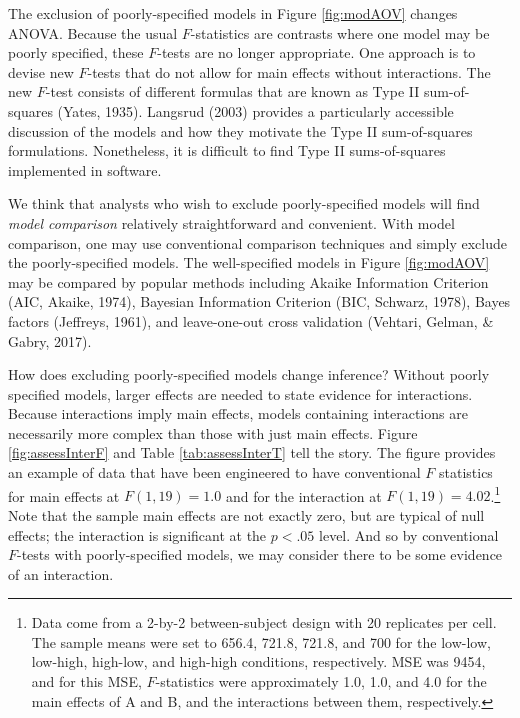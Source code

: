 \documentclass[
  english,
  ,man]{apa6}
\begin{document}
The exclusion of poorly-specified models in Figure \ref{fig:modAOV} changes ANOVA. Because the usual \(F\)-statistics are contrasts where one model may be poorly specified, these \(F\)-tests are no longer appropriate. One approach is to devise new \(F\)-tests that do not allow for main effects without interactions. The new \(F\)-test consists of different formulas that are known as Type II sum-of-squares (Yates, 1935). Langsrud (2003) provides a particularly accessible discussion of the models and how they motivate the Type II sum-of-squares formulations. Nonetheless, it is difficult to find Type II sums-of-squares implemented in software.

We think that analysts who wish to exclude poorly-specified models will find \emph{model comparison} relatively straightforward and convenient. With model comparison, one may use conventional comparison techniques and simply exclude the poorly-specified models. The well-specified models in Figure \ref{fig:modAOV} may be compared by popular methods including Akaike Information Criterion (AIC, Akaike, 1974), Bayesian Information Criterion (BIC, Schwarz, 1978), Bayes factors (Jeffreys, 1961), and leave-one-out cross validation (Vehtari, Gelman, \& Gabry, 2017).

How does excluding poorly-specified models change inference? Without poorly specified models, larger effects are needed to state evidence for interactions. Because interactions imply main effects, models containing interactions are necessarily more complex than those with just main effects. Figure \ref{fig:assessInterF} and Table \ref{tab:assessInterT} tell the story. The figure provides an example of data that have been engineered to have conventional \(F\) statistics for main effects at \(F(1,19)=1.0\) and for the interaction at \(F(1,19)=4.02\).\footnote{Data come from a 2-by-2 between-subject design with 20 replicates per cell. The sample means were set to 656.4, 721.8, 721.8, and 700 for the low-low, low-high, high-low, and high-high conditions, respectively. MSE was 9454, and for this MSE, \(F\)-statistics were approximately 1.0, 1.0, and 4.0 for the main effects of A and B, and the interactions between them, respectively.} Note that the sample main effects are not exactly zero, but are typical of null effects; the interaction is significant at the \(p<.05\) level. And so by conventional \(F\)-tests with poorly-specified models, we may consider there to be some evidence of an interaction.
\end{document}
